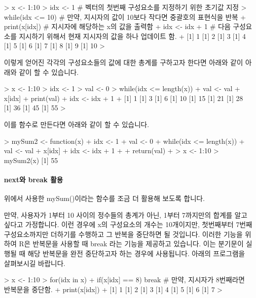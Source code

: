 \begin{Schunk}
\begin{Soutput}
> x <- 1:10
> idx <- 1              # 벡터의 첫번째 구성요소를 지정하기 위한 초기값 지정 
> while(idx <= 10){     # 만약, 지시자의 값이 10보다 작다면 중괄호의 표현식을 반복 
+ print(x[idx])         # 지시자에 해당하는 x의 값을 출력함 
+ idx <- idx + 1        # 다음 구성요소를 지시하기 위해서 현재 지시자의 값을 하나 업데이트 함.
+ }
[1] 1
[1] 2
[1] 3
[1] 4
[1] 5
[1] 6
[1] 7
[1] 8
[1] 9
[1] 10
> 
\end{Soutput}
\end{Schunk}

이렇게 얻어진 각각의 구성요소들의 값에 대한 총계를 구하고자 한다면 아래와 같이 아래와 같이 할 수 있습니다.

\begin{Schunk}
\begin{Soutput}
> x <- 1:10
> idx <- 1
> val <- 0
> while(idx <= length(x)){
+ val <- val + x[idx]
+ print(val)
+ idx <- idx + 1
+ }
[1] 1
[1] 3
[1] 6
[1] 10
[1] 15
[1] 21
[1] 28
[1] 36
[1] 45
[1] 55
> 
\end{Soutput}
\end{Schunk}

이를 함수로 만든다면 아래와 같이 할 수 있습니다. 

\begin{Schunk}
\begin{Soutput}
> mySum2 <- function(x){
+ idx <- 1
+ val <- 0
+ while(idx <= length(x)){
+ val <- val + x[idx]
+ idx <- idx + 1
+ }
+ return(val)
+ }
> x <- 1:10
> mySum2(x)
[1] 55
\end{Soutput}
\end{Schunk}

\paragraph{next와 break 활용}

위에서 사용한 mySum()이라는 함수를 조금 더 활용해 보도록 합니다.

만약, 사용자가 1부터 10 사이의 정수들의 총계가 아닌, 1부터 7까지만의 합계를 알고 싶다고 가정합니다. 
이런 경우에 x의 구성요소의 개수는 10개이지만, 첫번째부터 7번째 구성요소까지만 더하기를 수행하고 그 반복을 중단하면 될 것입니다.
이러한 기능을 위하여 R은 반복문을 사용할 때 break 라는 기능을 제공하고 있습니다.
이는 분기문이 실행될 때 해당 반복문을 완전 중단하고자 하는 경우에 사용됩니다. 
아래의 프로그램을 살펴보시길 바랍니다. 

\begin{Schunk}
\begin{Soutput}
> x <- 1:10
> for(idx in x){
+ if(x[idx] == 8) break  # 만약, 지시자가 8번째라면 반복문을 중단함. 
+ print(x[idx])
+ }
[1] 1
[1] 2
[1] 3
[1] 4
[1] 5
[1] 6
[1] 7
> 
\end{Soutput}
\end{Schunk}

